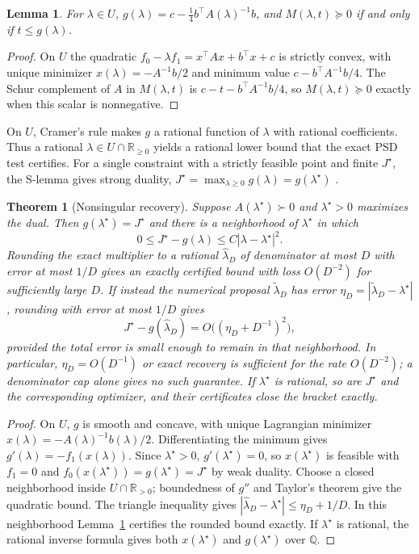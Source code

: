 \documentclass[11pt]{article}
\newcommand{\R}{\mathbb{R}}
\newcommand{\Q}{\mathbb{Q}}
\theoremstyle{plain}
\newtheorem{theorem}{Theorem}
\newtheorem{lemma}{Lemma}
\theoremstyle{remark}
\begin{document}
\begin{lemma}\label{lem:schur}
For $\lambda\in U$, $g(\lambda)=c-\tfrac14 b^\top A(\lambda)^{-1}b$, and
$M(\lambda,t)\succeq0$ if and only if $t\le g(\lambda)$.
\end{lemma}
\begin{proof}
On $U$ the quadratic $f_0-\lambda f_1=x^\top Ax+b^\top x+c$ is strictly
convex, with unique minimizer $x(\lambda)=-A^{-1}b/2$ and minimum value
$c-b^\top A^{-1}b/4$. The Schur complement of $A$ in $M(\lambda,t)$ is
$c-t-b^\top A^{-1}b/4$, so $M(\lambda,t)\succeq0$ exactly when this scalar
is nonnegative.
\end{proof}

On $U$, Cramer's rule makes $g$ a rational function of $\lambda$ with rational
coefficients. Thus a rational $\lambda\in U\cap\R_{\ge0}$ yields a rational
lower bound that the exact PSD test certifies. For a single constraint with a
strictly feasible point and finite $J^\star$, the S-lemma gives strong duality,
$J^\star=\max_{\lambda\ge0}g(\lambda)=g(\lambda^\star)$
\cite{yakubovich1971}.

\begin{theorem}[Nonsingular recovery]\label{thm:recovery}
Suppose $A(\lambda^\star)\succ0$ and $\lambda^\star>0$ maximizes the dual.
Then $g(\lambda^\star)=J^\star$ and there is a neighborhood of $\lambda^\star$
in which
\[
0\le J^\star-g(\lambda)\le C|\lambda-\lambda^\star|^2.
\]
Rounding the exact multiplier to a rational $\widehat\lambda_D$ of denominator
at most $D$ with error at most $1/D$ gives an exactly certified bound with
loss $O(D^{-2})$ for sufficiently large $D$.
If instead the numerical proposal $\widetilde\lambda_D$ has error
$\eta_D=|\widetilde\lambda_D-\lambda^\star|$, rounding with error at most $1/D$
gives
\[
J^\star-g(\widehat\lambda_D)=O\bigl((\eta_D+D^{-1})^2\bigr),
\]
provided the total error is small enough to remain in that neighborhood.
In particular, $\eta_D=O(D^{-1})$ or exact recovery is sufficient for the
rate $O(D^{-2})$; a denominator cap alone gives no such guarantee.
If $\lambda^\star$ is rational, so are $J^\star$ and the corresponding
optimizer, and their certificates close the bracket exactly.
\end{theorem}
\begin{proof}
On $U$, $g$ is smooth and concave, with unique Lagrangian minimizer
$x(\lambda)=-A(\lambda)^{-1}b(\lambda)/2$. Differentiating the minimum gives
$g'(\lambda)=-f_1(x(\lambda))$. Since $\lambda^\star>0$,
$g'(\lambda^\star)=0$, so $x(\lambda^\star)$ is feasible with $f_1=0$ and
$f_0(x(\lambda^\star))=g(\lambda^\star)=J^\star$ by weak duality.
Choose a closed neighborhood inside $U\cap\R_{>0}$; boundedness of $g''$ and
Taylor's theorem give the quadratic bound. The triangle inequality gives
$|\widehat\lambda_D-\lambda^\star|\le\eta_D+1/D$. In this neighborhood
Lemma~\ref{lem:schur} certifies the rounded bound exactly. If $\lambda^\star$
is rational, the rational inverse formula gives both $x(\lambda^\star)$ and
$g(\lambda^\star)$ over $\Q$.
\end{proof}
\end{document}

